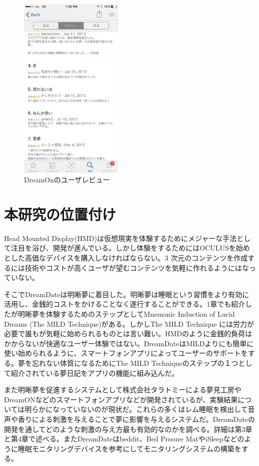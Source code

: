 \begin{figure}[htbp]
\begin{center}
\includegraphics[width=5cm]{eps/dreamOn.eps}
\caption{DreamOnのユーザレビュー}
\label{DreamOnImage}
\end{center}
\end{figure}

\section{本研究の位置付け}
Head Mounted Display(HMD)は仮想現実を体験するためにメジャーな手法として注目を浴び、開発が進んでいる。しかし体験をするためにはOCULUSを始めとした高価なデバイスを購入しなければならない。3 次元のコンテンツを作成するには技術やコストが高くユーザが望むコンテンツを気軽に作れるようにはなっていない。

そこでDreamDateは明晰夢に着目した。明晰夢は睡眠という習慣をより有効に活用し、金銭的コストをかけることなく遂行することができる。1章でも紹介したが明晰夢を体験するためのステップとしてMnemonic Induction of Lucid Dreams (The MILD Technique)がある。しかしThe MILD Technique には労力が必要で誰もが気軽に始められるものとは言い難い。HMDのように金銭的負荷はかからないが快適なユーザー体験ではない。DreamDateはMILDよりにも簡単に使い始められるように、スマートフォンアプリによってユーザーのサポートをする。夢を忘れない体質になるためにThe MILD Techniqueのステップの１つとして紹介されている夢日記をアプリの機能に組み込んだ。

また明晰夢を促進するシステムとして株式会社タラトミーによる夢見工房やDreamONなどのスマートフォンアプリなどが開発されているが、実験結果については明らかになっていないのが現状だ。これらの多くはレム睡眠を検出して音声や香りによる刺激を与えることで夢に影響を与えるシステムだ。DreamDateの開発を通してどのような刺激の与え方最も有効的なのかを調べる。詳細は第3章と第4章で述べる。またDreamDateはbeddit\cite{beddit}、Bed Prssure MatやiSleep\cite{iSleep}などのように睡眠モニタリングデバイスを参考にしてモニタリングシステムの構築をする。

